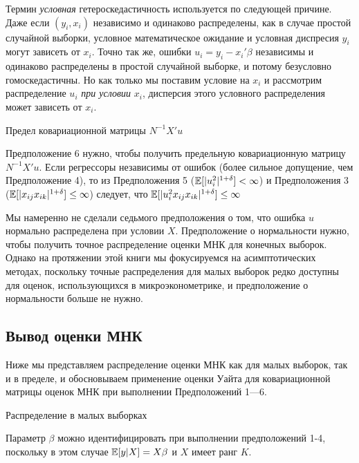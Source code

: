 Термин \textit{условная} гетероскедастичность используется по следующей причине. Даже если $(y_i, x_i)$ независимо и одинаково распределены, как в случае простой случайной выборки, условное математическое ожидание и условная диспресия $y_i$ могут зависеть от $x_i$. Точно так же, ошибки $u_i = y_i - x_i'\beta$ независимы и одинаково распределены в простой случайной выборке, и потому безусловно гомоскедастичны. Но как только мы поставим условие на $x_i$ и рассмотрим распределение $u_i$ \textit{при условии} $x_i$, дисперсия этого условного распределения может зависеть от $x_i$.

\begin{center}
Предел ковариационной матрицы $N^{-1}X'u$ 
\end{center}
Предположение 6 нужно, чтобы получить предельную ковариационную матрицу $N^{-1}X'u$. Если регрессоры независимы от ошибок (более сильное допущение, чем Предположение 4), то из Предположения 5 ($\mathbb{E} [|u_i^2|^{1+\delta}]< \infty$) и Предположения 3 ($\mathbb{E}[|x_{ij}x_{ik}|^{1+\delta}]\leq \infty$) следует, что $\mathbb{E}[|u_i^2 x_{ij}x_{ik}|^{1+\delta}]\leq \infty$

Мы намеренно не сделали седьмого предположения о том, что ошибка $u$ нормально распределена при условии $X$. Предположение о нормальности нужно, чтобы получить точное распределение оценки МНК для конечных выборок. Однако на протяжении этой книги мы фокусируемся на асимптотических методах, поскольку точные распределения для малых выборок редко доступны для оценок, использующихся в микроэконометрике, и предположение о нормальности больше не нужно.

\subsection{Вывод оценки МНК}
Ниже мы представляем распределение оценки МНК как для малых выборок, так и в пределе, и обосновываем применение оценки Уайта для ковариационной матрицы оценок МНК при выполнении Предположений 1---6.

\begin{center}
 Распределение в малых выборках
 \end{center} 

Параметр $\beta$ можно идентифицировать при выполнении предположений 1-4, поскольку в этом случае $\mathbb{E}	[y|X] = X\beta$ и $X$ имеет ранг $K$.

